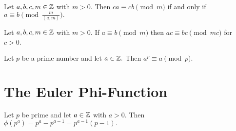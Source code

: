 \documentclass[letterpaper, 11 pt]{ximera}
\begin{document}
\begin{prop*}[Proposition 2.5]\label{prop:equiv-gcd}
    Let $a,b,c,m\in\mathbb Z$ with $m>0.$ Then $ca\equiv cb\pmod{m}$ if and only if $a\equiv b\pmod{\tfrac{m}{(a,m)}}.$
\end{prop*}


\begin{lem*}\label{ex-equiv-upmod}
    Let $a,b,c,m\in\mathbb Z$ with $m>0.$ If $a\equiv b \pmod{m}$ then $ac\equiv bc \pmod{mc}$ for $c>0$.
\end{lem*}


\begin{cor*}[Corollary 2.15]\label{cor:a_power_prime_mod}
    Let $p$ be a prime number and let $a\in\mathbb Z.$ Then $a^p\equiv a\pmod{p}.$
\end{cor*}

\section*{The Euler Phi-Function}

\begin{thm*}[Theorem 3.3]\label{thm:phi-prime-power}
    Let $p$ be prime and let $a\in\mathbb Z$ with $a>0.$ Then $\phi(p^a)=p^a-p^{a-1}=p^{a-1}(p-1).$
\end{thm*}
\end{document}
